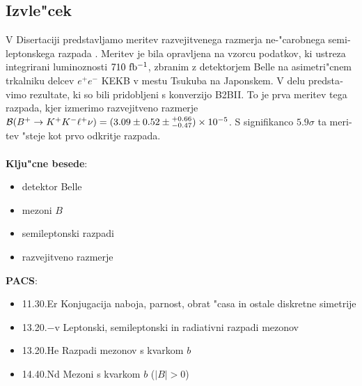 \begin{otherlanguage}{slovene}

\cleardoublepage
\chapter*{Izvle"cek}
V Disertaciji predstavljamo meritev razvejitvenega razmerja ne-"carobnega semileptonskega razpada \decayb. Meritev je bila opravljena na vzorcu podatkov, ki ustreza integrirani luminoznosti $710\mathrm{~fb^{-1}}$, zbranim z detektorjem Belle na asimetri"cnem trkalniku delcev $e^+e^-$ KEKB v mestu Tsukuba na Japonskem. V delu predstavimo rezultate, ki so bili pridobljeni s konverzijo B2BII. To je prva meritev tega razpada, kjer izmerimo razvejitveno razmerje $\mathcal{B}(B^+ \to K^+ K^- \ell^+ \nu) = (3.09 \pm 0.52 \pm {}^{+0.66}_{-0.47})\times 10^{-5}$. S signifikanco $5.9\sigma$ ta meritev "steje kot prvo odkritje razpada.\\
\vspace{1cm}\\
{{\bf Klju"cne besede}:}
\begin{itemize}
	\item detektor Belle
	\item mezoni $B$
	\item semileptonski razpadi
	\item razvejitveno razmerje
\end{itemize}
\vspace{1cm}
{{\bf PACS}:}
\begin{itemize}
	\item 11.30.Er Konjugacija naboja, parnost, obrat "casa in ostale diskretne simetrije
	\item 13.20.−v Leptonski, semileptonski in radiativni razpadi mezonov
	\item 13.20.He Razpadi mezonov s kvarkom $b$
	\item 14.40.Nd Mezoni s kvarkom $b$ ($|B|>0$) 
\end{itemize}
\end{otherlanguage}

\pagestyle{empty}

\cleardoublepage
\pagestyle{plain}

